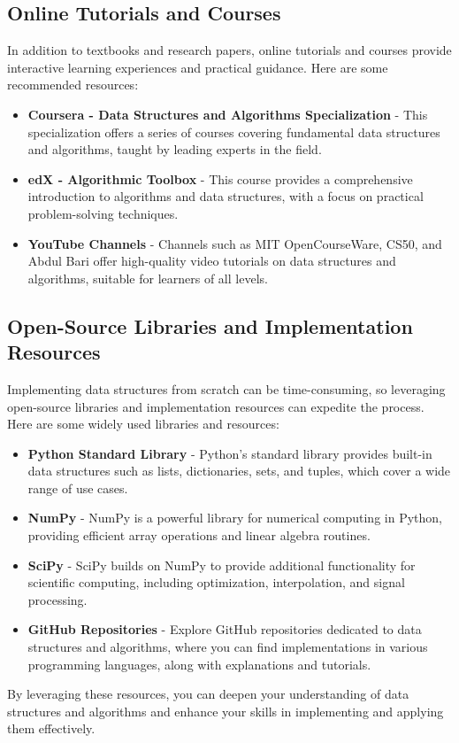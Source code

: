 \documentclass[12pt]{book} %
\begin{document}
\subsection{Online Tutorials and Courses}

In addition to textbooks and research papers, online tutorials and courses provide interactive learning experiences and practical guidance. Here are some recommended resources:

\begin{itemize}
    \item \textbf{Coursera - Data Structures and Algorithms Specialization} - This specialization offers a series of courses covering fundamental data structures and algorithms, taught by leading experts in the field.
    
    \item \textbf{edX - Algorithmic Toolbox} - This course provides a comprehensive introduction to algorithms and data structures, with a focus on practical problem-solving techniques.
    
    \item \textbf{YouTube Channels} - Channels such as MIT OpenCourseWare, CS50, and Abdul Bari offer high-quality video tutorials on data structures and algorithms, suitable for learners of all levels.
\end{itemize}

\subsection{Open-Source Libraries and Implementation Resources}

Implementing data structures from scratch can be time-consuming, so leveraging open-source libraries and implementation resources can expedite the process. Here are some widely used libraries and resources:

\begin{itemize}
    \item \textbf{Python Standard Library} - Python's standard library provides built-in data structures such as lists, dictionaries, sets, and tuples, which cover a wide range of use cases.
    
    \item \textbf{NumPy} - NumPy is a powerful library for numerical computing in Python, providing efficient array operations and linear algebra routines.
    
    \item \textbf{SciPy} - SciPy builds on NumPy to provide additional functionality for scientific computing, including optimization, interpolation, and signal processing.
    
    \item \textbf{GitHub Repositories} - Explore GitHub repositories dedicated to data structures and algorithms, where you can find implementations in various programming languages, along with explanations and tutorials.
\end{itemize}

By leveraging these resources, you can deepen your understanding of data structures and algorithms and enhance your skills in implementing and applying them effectively.
\end{document}
